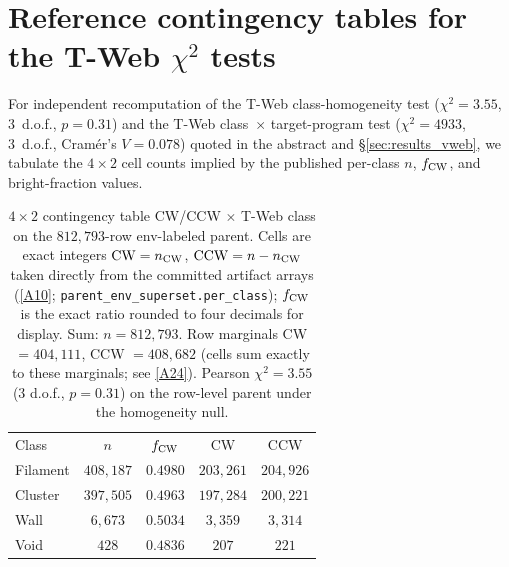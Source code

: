 \documentclass[aps,prd,twocolumn,superscriptaddress,showpacs,preprintnumbers,nofootinbib,longbibliography,floatfix]{revtex4-2}
\newcommand{\repoBase}{https://github.com/Hubify-Projects/bigbounce/blob/main}
\begin{document}
\section{Reference contingency tables for the T-Web $\chi^2$ tests}\label{app:contingency}

For independent recomputation of the T-Web class-homogeneity test
($\chi^2 = 3.55$, 3~d.o.f., $p = 0.31$) and the T-Web class~$\times$
target-program test ($\chi^2 = 4933$, 3~d.o.f., Cram\'er's $V = 0.078$)
quoted in the abstract and \S\ref{sec:results_vweb}, we tabulate
the $4{\times}2$ cell counts implied by the published per-class $n$,
$f_{\rm CW}$, and bright-fraction values.

\begin{table}[h]
\caption{$4{\times}2$ contingency table CW/CCW $\times$ T-Web class on
the $812{,}793$-row env-labeled parent. Cells are exact integers
$\mathrm{CW} = n_{\rm CW}$, $\mathrm{CCW} = n - n_{\rm CW}$ taken
directly from the committed artifact arrays
(\href{\repoBase/pipelines/p5\_desi\_chirality/outputs/17\_v0151\_closure\_recomputes.json}{[A10]};
\texttt{parent\_env\_superset.per\_class}); $f_{\rm CW}$ is the
exact ratio rounded to four decimals for display. Sum: $n = 812{,}793$.
Row marginals CW $= 404{,}111$, CCW $= 408{,}682$ (cells sum exactly to
these marginals; see
\href{\repoBase/pipelines/p5\_desi\_chirality/outputs/31\_ext5\_appendixB\_tables.json}{[A24]}).
Pearson $\chi^2 = 3.55$ ($3$ d.o.f., $p = 0.31$) on the row-level
parent under the homogeneity null.\label{tab:contingency_classCWCCW}}
\begin{ruledtabular}
\begin{tabular}{lcccc}
Class & $n$ & $f_{\rm CW}$ & CW & CCW \\
\colrule
Filament & $408{,}187$ & $0.4980$ & $203{,}261$ & $204{,}926$ \\
Cluster  & $397{,}505$ & $0.4963$ & $197{,}284$ & $200{,}221$ \\
Wall     & $6{,}673$   & $0.5034$ & $3{,}359$   & $3{,}314$   \\
Void     & $428$       & $0.4836$ & $207$       & $221$       \\
\end{tabular}
\end{ruledtabular}
\end{table}
\end{document}
